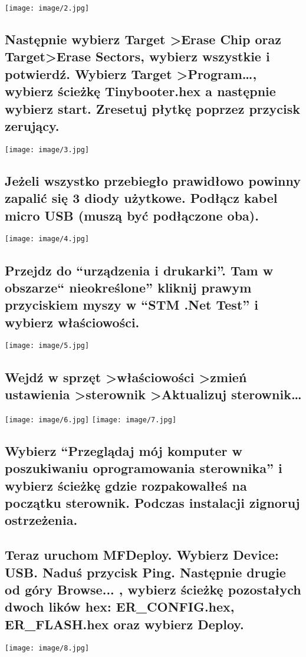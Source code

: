 ﻿\documentclass{article}
\begin{document}
\texttt{[image: image/2.jpg]}
\subsection{Następnie wybierz Target \textgreater Erase Chip oraz Target\textgreater Erase Sectors, wybierz wszystkie i potwierdź. Wybierz Target \textgreater Program…, wybierz ścieżkę Tinybooter.hex a następnie wybierz start. Zresetuj płytkę poprzez przycisk zerujący.}

\texttt{[image: image/3.jpg]}
\subsection{Jeżeli wszystko przebiegło prawidłowo powinny zapalić się 3 diody użytkowe. Podłącz kabel micro USB (muszą być podłączone oba).}

\texttt{[image: image/4.jpg]}
\subsection{Przejdz do “urządzenia i drukarki”. Tam w obszarze“ nieokreślone” kliknij prawym przyciskiem myszy w “STM .Net Test” i wybierz właściowości.}

\texttt{[image: image/5.jpg]}
\subsection{Wejdź w sprzęt \textgreater właściowości \textgreater zmień ustawienia \textgreater sterownik \textgreater Aktualizuj sterownik…}

\texttt{[image: image/6.jpg]}
\texttt{[image: image/7.jpg]} 
\subsection{Wybierz “Przeglądaj mój komputer w poszukiwaniu oprogramowania sterownika” i wybierz ścieżkę gdzie rozpakowalłeś na początku sterownik. Podczas instalacji zignoruj ostrzeżenia.}

\subsection{Teraz uruchom MFDeploy. Wybierz Device: USB. Naduś przycisk Ping. Następnie drugie od góry Browse... , wybierz ścieżkę pozostałych dwoch lików hex: ER\_CONFIG.hex, ER\_FLASH.hex oraz wybierz Deploy.}
\texttt{[image: image/8.jpg]}
\end{document}
